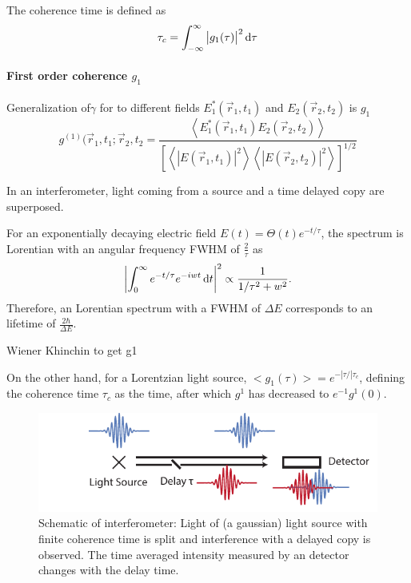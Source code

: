 The coherence time is defined as 
\begin{equation}
\tau_c = \int_{-\infty}^{\infty} \left| g_1(\tau)\right|^2 \operatorname{\mathrm{d}\!} \tau 
\end{equation}





\paragraph{First order coherence $g_1$}
Generalization of$\gamma$  for to different fields  $E_1^*(\vec{r}_1,t_1)$ and $E_2(\vec{r}_2,t_2)$ is $g_1$
\begin{equation}
	g^{(1)}(\vec{r}_1,t_1;\vec{r}_2,t_2= \frac
	{\left< E_1^*(\vec{r}_1,t_1)E_2(\vec{r}_2,t_2) \right>}
	{\left[ \left<\left | E(\vec{r}_1,t_1)\right |^2 \right> \left< \left |E(\vec{r}_2,t_2)\right |^2 \right>\right]^{1/2}}	
\end{equation}






In an interferometer, light coming from a source and a time delayed copy are superposed.



For an exponentially decaying electric field $E(t)=\Theta(t)e^{-t/\tau}$, the spectrum is Lorentian with an angular frequency FWHM of $\frac{2}{\tau}$ as 
\begin{equation*}
\left|\int_{0}^{\infty}  e^{-t/\tau} e^{-iwt} \dif t \right|^2 \propto  \frac{1}{1/\tau^2+w^2} .
\end{equation*}
Therefore, an Lorentian spectrum with a FWHM of $\Delta E$ corresponds to an lifetime of $\frac{2\hbar}{\Delta E}$.

Wiener Khinchin to get g1

On the other hand, for a Lorentzian light source, $<g_1(\tau)>=e^{-|\tau/| \tau_c}$, defining the coherence time $\tau_c$ as the time, after which $g^1$ has decreased to $e^{-1} g^1(0)$.

 \begin{figure}
	\centering
	\includegraphics[width=0.8\linewidth]{images/michelson.pdf}
	\caption[Schematic of interferometer]{Schematic of interferometer: Light of (a gaussian) light source with finite coherence time is split and interference with a delayed copy is observed. The time averaged intensity measured by an detector changes with the delay time. }
	\label{fig:michelson}
\end{figure}

